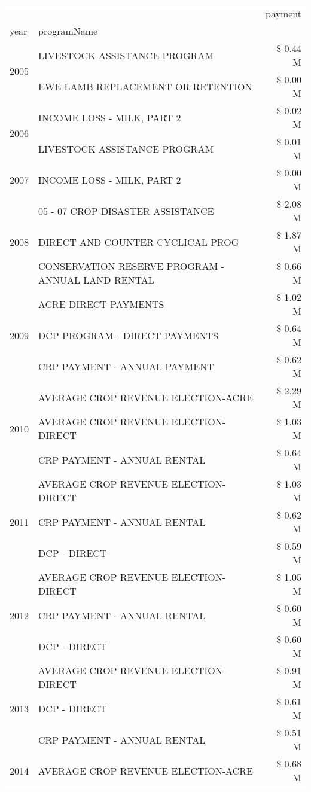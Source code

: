 \begin{tabular}{llr}
\toprule
 &  & payment \\
year & programName &  \\
\midrule
\multirow[t]{2}{*}{2005} & LIVESTOCK ASSISTANCE PROGRAM & \$ 0.44 M \\
 & EWE LAMB REPLACEMENT OR RETENTION & \$ 0.00 M \\
\cline{1-3}
\multirow[t]{2}{*}{2006} & INCOME LOSS - MILK, PART 2 & \$ 0.02 M \\
 & LIVESTOCK ASSISTANCE PROGRAM & \$ 0.01 M \\
\cline{1-3}
2007 & INCOME LOSS - MILK, PART 2 & \$ 0.00 M \\
\cline{1-3}
\multirow[t]{3}{*}{2008} & 05 - 07 CROP DISASTER ASSISTANCE & \$ 2.08 M \\
 & DIRECT AND COUNTER CYCLICAL PROG & \$ 1.87 M \\
 & CONSERVATION RESERVE PROGRAM - ANNUAL LAND RENTAL & \$ 0.66 M \\
\cline{1-3}
\multirow[t]{3}{*}{2009} & ACRE DIRECT PAYMENTS & \$ 1.02 M \\
 & DCP PROGRAM - DIRECT PAYMENTS & \$ 0.64 M \\
 & CRP PAYMENT - ANNUAL PAYMENT & \$ 0.62 M \\
\cline{1-3}
\multirow[t]{3}{*}{2010} & AVERAGE CROP REVENUE ELECTION-ACRE & \$ 2.29 M \\
 & AVERAGE CROP REVENUE ELECTION-DIRECT & \$ 1.03 M \\
 & CRP PAYMENT - ANNUAL RENTAL & \$ 0.64 M \\
\cline{1-3}
\multirow[t]{3}{*}{2011} & AVERAGE CROP REVENUE ELECTION-DIRECT & \$ 1.03 M \\
 & CRP PAYMENT - ANNUAL RENTAL & \$ 0.62 M \\
 & DCP - DIRECT & \$ 0.59 M \\
\cline{1-3}
\multirow[t]{3}{*}{2012} & AVERAGE CROP REVENUE ELECTION-DIRECT & \$ 1.05 M \\
 & CRP PAYMENT - ANNUAL RENTAL & \$ 0.60 M \\
 & DCP - DIRECT & \$ 0.60 M \\
\cline{1-3}
\multirow[t]{3}{*}{2013} & AVERAGE CROP REVENUE ELECTION-DIRECT & \$ 0.91 M \\
 & DCP - DIRECT & \$ 0.61 M \\
 & CRP PAYMENT - ANNUAL RENTAL & \$ 0.51 M \\
\cline{1-3}
\multirow[t]{3}{*}{2014} & AVERAGE CROP REVENUE ELECTION-ACRE & \$ 0.68 M \\

\end{tabular}
